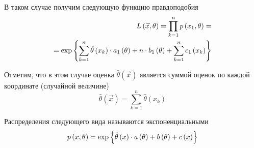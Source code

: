 В таком случае получим следующую функцию правдоподобия
\begin{align*}
    L\left( \vec{x},\theta \right)
    =\prod_{k=1}^np\left(x_1,\theta\right)=\\
    =\exp{\left\{\sum_{k=1}^n \hat{\theta}\left(x_k\right)\cdot a_1\left(\theta\right)
        +n\cdot b_1\left( \theta \right)
        +\sum_{k=1}^n c_1\left( x_k \right)\right\}}
\end{align*}

Отметим, что в этом случае оценка $\hat{\theta}\left( \vec{x} \right)$
является суммой оценок по каждой координате (случайной величине)
$$\hat{\theta}\left(\vec{x}\right)=\sum_{k=1}^n \hat{\theta}\left(x_k\right)$$

\begin{definition}
    Распределения следующего вида называются экспоненциальными
    $$p\left(x,\theta\right)
        =\exp{\left\{\hat{\theta}\left(x\right)\cdot a\left(\theta\right)
            +b\left( \theta \right)+c\left( x \right)\right\}}$$
\end{definition}

